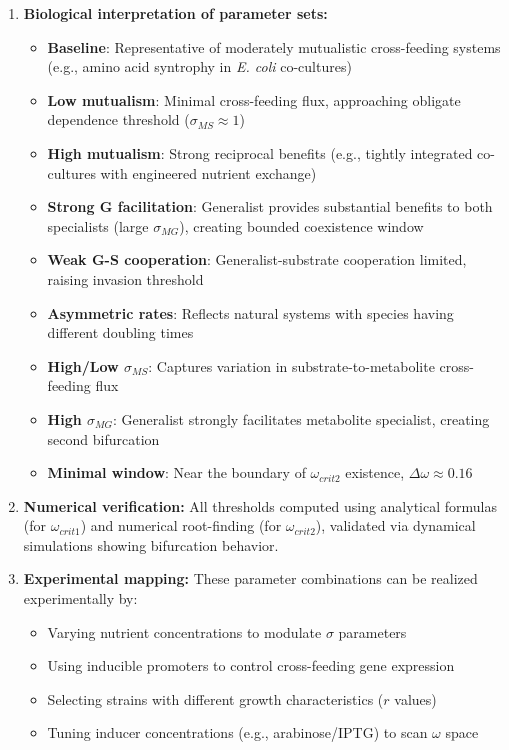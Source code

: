 \documentclass[11pt]{article}
\begin{document}
\begin{enumerate}
    \item \textbf{Biological interpretation of parameter sets:}
    \begin{itemize}
        \item \textbf{Baseline}: Representative of moderately mutualistic cross-feeding systems (e.g., amino acid syntrophy in \textit{E. coli} co-cultures)
        \item \textbf{Low mutualism}: Minimal cross-feeding flux, approaching obligate dependence threshold ($\sigma_{MS} \approx 1$)
        \item \textbf{High mutualism}: Strong reciprocal benefits (e.g., tightly integrated co-cultures with engineered nutrient exchange)
        \item \textbf{Strong G facilitation}: Generalist provides substantial benefits to both specialists (large $\sigma_{MG}$), creating bounded coexistence window
        \item \textbf{Weak G-S cooperation}: Generalist-substrate cooperation limited, raising invasion threshold
        \item \textbf{Asymmetric rates}: Reflects natural systems with species having different doubling times
        \item \textbf{High/Low $\sigma_{MS}$}: Captures variation in substrate-to-metabolite cross-feeding flux
        \item \textbf{High $\sigma_{MG}$}: Generalist strongly facilitates metabolite specialist, creating second bifurcation
        \item \textbf{Minimal window}: Near the boundary of $\omega_{crit2}$ existence, $\Delta\omega \approx 0.16$
    \end{itemize}

    \item \textbf{Numerical verification:} All thresholds computed using analytical formulas (for $\omega_{crit1}$) and numerical root-finding (for $\omega_{crit2}$), validated via dynamical simulations showing bifurcation behavior.

    \item \textbf{Experimental mapping:} These parameter combinations can be realized experimentally by:
    \begin{itemize}
        \item Varying nutrient concentrations to modulate $\sigma$ parameters
        \item Using inducible promoters to control cross-feeding gene expression
        \item Selecting strains with different growth characteristics ($r$ values)
        \item Tuning inducer concentrations (e.g., arabinose/IPTG) to scan $\omega$ space
    \end{itemize}
\end{enumerate}
\end{document}

